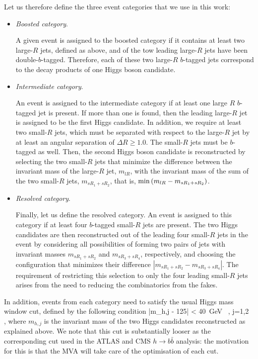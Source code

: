 Let us therefore define the three event categories that
we use in this work:
\begin{itemize}
\item {\it Boosted category}.

  A given event is assigned to the boosted category if it
  contains at least two large-$R$ jets, defined as above,
  and of the tow leading large-$R$ jets have been double-$b$-tagged.
 Therefore, each of these two large-$R$ $b$-tagged jets correspond to the
 decay products of one Higgs boson candidate.

\item {\it Intermediate category}.

  An event is assigned to the intermediate category if
  at least one large $R$ $b$-tagged jet is present.
  If more than one is found, then the leading large-$R$ jet
  is assigned to be the first Higgs candidate.
  In addition, we require at least two small-$R$ jets,
  which must be separated with respect to the large-$R$
  jet by at least an angular separation of $\Delta R\ge 1.0$.
  The small-$R$ jets must be $b$-tagged as well.
  Then, the second Higgs boson candidate is reconstructed
  by selecting the two small-$R$ jets that minimize the difference
  between the invariant mass of the large-$R$ jet, $m_{lR}$,
  with the invariant mass of the sum of the two small-$R$ jets,
  $m_{sR_1+sR_2}$, that is, ${\rm min}\left( m_{lR} -
  m_{sR_1+sR_2}\right)$.

\item {\it Resolved category}.

  Finally, let us define the resolved category.
  An event is assigned to this category
  if at least
  four $b$-tagged small-$R$ jets are present.
  The two Higgs candidates are then reconstructed out of the
  leading four small-$R$ jets in the event
  by considering all possibilities of forming two pairs of jets
  with invariant masses $m_{sR_1+sR_2}$ and 
$m_{sR_3+sR_4}$, respectively, and choosing the configuration that minimizes their difference $|m_{sR_1+sR_2} - m_{sR_3+sR_4}|$. 
  The requirement of restricting this selection to only the four
  leading small-$R$ jets arises from the need to reducing the
  combinatorics from the fakes.
\end{itemize}

In addition, events from each category need to satisfy the usual
Higgs mass window cut, defined by
the following condition
\be
|m_{h,j} - 125| < 40~{\rm GeV} \, , j=1,2 \, ,
\ee
where $m_{h,j}$ is the invariant mass of the two Higgs candidates
reconstructed as explained above.
%
We note that this cut is substantially looser as the corresponding
cut used in the ATLAS and CMS $h\to b\bar{b}$ analysis: the motivation
for this is that the MVA will take care of the optimisation of each cut.



